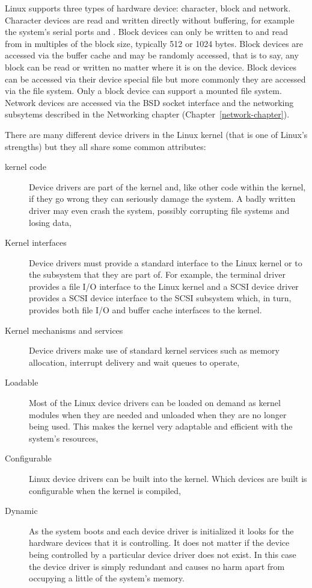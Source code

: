 Linux supports three types of hardware device: character, block and network.
Character devices are read and written directly without buffering, for example the system's
serial ports  and .
Block devices can only be written to and read from in multiples of the block size, typically
512 or 1024 bytes.
Block devices are accessed via the buffer cache and may be randomly accessed, that is to say,
any block can be read or written no matter where it is on the device.
Block devices can be accessed via their device special file but more commonly they are accessed via the file system.
Only a block device can support a mounted file system.
Network devices are accessed via the BSD socket interface and the networking subsytems described in the
Networking chapter (Chapter~\ref{network-chapter}).

There are many different device drivers in the Linux kernel (that is one of
Linux's strengths) but they all share some common attributes:
\begin{description}
	\item [kernel code] Device drivers are part of the kernel and, like 
	other code within the kernel, if they go wrong they can seriously 
	damage the system.
	A badly written driver may even crash the system, possibly corrupting 
	file systems and losing data,

	\item [Kernel interfaces] Device drivers must provide a standard 
	interface to the Linux kernel or to the subsystem that they are part
	of.  For example, the terminal driver provides a file I/O interface
	to the Linux kernel and a SCSI device driver provides a SCSI device
	interface to the SCSI subsystem which, in turn, provides both 
	file I/O and buffer cache interfaces to the kernel.

	\item [Kernel mechanisms and services] Device drivers make use of 
	standard kernel services such as memory allocation, interrupt delivery
	and wait queues to operate,

	\item [Loadable] Most of the Linux device drivers can be loaded on demand as kernel
	modules when
	they are needed and unloaded when they are no longer being used.  This makes the
	kernel very adaptable and efficient with the system's resources,
	
	\item [Configurable] Linux device drivers can be built into the kernel.  Which
	devices are built is configurable when the kernel is compiled,

	\item [Dynamic] As the system boots and each device driver is initialized it looks
	for the hardware devices that it is controlling.
	It does not matter if the device being controlled by a particular device driver 
	does not exist.  In
	this case the device driver is simply redundant and causes no harm apart from 
	occupying a little of the system's memory.
\end{description}



